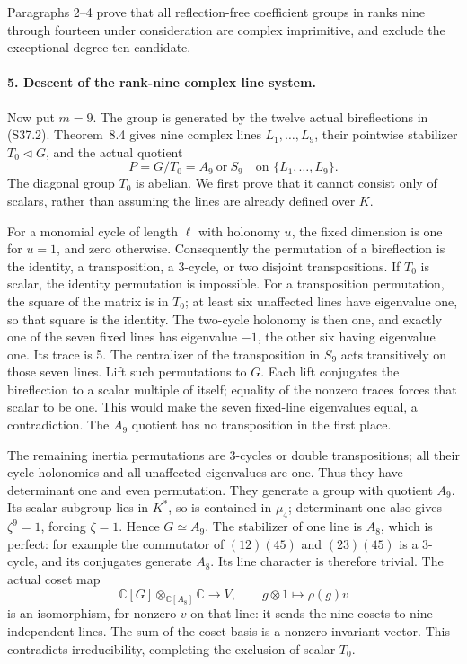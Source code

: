 Paragraphs 2--4 prove that all reflection-free coefficient groups
in ranks nine through fourteen under consideration are complex
imprimitive, and exclude the exceptional degree-ten candidate.

\paragraph{5. Descent of the rank-nine complex line system.}
Now put \(m=9\). The group is generated by the twelve actual
bireflections in (S37.2). Theorem~8.4 gives nine complex lines
\(L_1,\ldots,L_9\), their pointwise stabilizer
\(T_0\triangleleft G\), and the actual quotient
\[
       P=G/T_0=A_9\ \text{or}\ S_9
       \quad\text{on }\{L_1,\ldots,L_9\}.                  \tag{S37.8}
\]
The diagonal group \(T_0\) is abelian. We first prove that it
cannot consist only of scalars, rather than assuming the lines
are already defined over \(K\).

For a monomial cycle of length \(\ell\) with holonomy \(u\),
the fixed dimension is one for \(u=1\), and zero otherwise.
Consequently the permutation of a bireflection is the identity,
a transposition, a 3-cycle, or two disjoint transpositions.
If \(T_0\) is scalar, the identity permutation is impossible.
For a transposition permutation, the square of the matrix is in
\(T_0\); at least six unaffected lines have eigenvalue one,
so that square is the identity. The two-cycle holonomy is then
one, and exactly one of the seven fixed lines has eigenvalue
\(-1\), the other six having eigenvalue one. Its trace is 5.
The centralizer of the transposition in \(S_9\) acts
transitively on those seven lines. Lift such permutations to
\(G\). Each lift conjugates the bireflection to a scalar
multiple of itself; equality of the nonzero traces forces that
scalar to be one. This would make the seven fixed-line
eigenvalues equal, a contradiction. The \(A_9\) quotient has
no transposition in the first place.

The remaining inertia permutations are 3-cycles or double
transpositions; all their cycle holonomies and all unaffected
eigenvalues are one. Thus they have determinant one and even
permutation. They generate a group with quotient \(A_9\).
Its scalar subgroup lies in \(K^*\), so is contained in
\(\mu_4\); determinant one also gives \(\zeta^9=1\),
forcing \(\zeta=1\). Hence \(G\simeq A_9\).
The stabilizer of one line is \(A_8\), which is perfect:
for example the commutator of \((12)(45)\) and
\((23)(45)\) is a 3-cycle, and its conjugates generate \(A_8\).
Its line character is therefore trivial. The actual coset map
\[
    \mathbb C[G]\otimes_{\mathbb C[A_8]}\mathbb C
       \longrightarrow V,\qquad g\otimes1\longmapsto\rho(g)v
                                                               \tag{S37.9}
\]
is an isomorphism, for nonzero \(v\) on that line: it sends
the nine cosets to nine independent lines. The sum of the coset
basis is a nonzero invariant vector. This contradicts
irreducibility, completing the exclusion of scalar \(T_0\).


